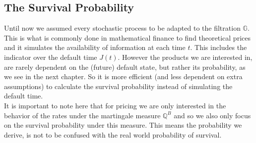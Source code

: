 \documentclass[12pt]{article}
\begin{document}
	
	\subsection{The Survival Probability}
	Until now we assumed every stochastic process to be adapted to the filtration $\mathbb{G}$. This is what is commonly done in mathematical finance to find theoretical prices and it simulates the availability of  information at each time $t$. This includes the indicator over the default time $J(t)$. However the products we are interested in, are rarely dependent on the (future) default state, but rather its probability, as we see in the next chapter. So it is more efficient (and less dependent on extra assumptions) to calculate the survival probability instead of simulating the default time.\\
	
	It is important to note here that for pricing we are only interested in the behavior of the rates under the martingale measure $\mathbb{Q}^B$ and so we also only focus on the survival probability under this measure. This means the probability we derive, is not to be confused with the real world probability of survival.\\
	
\end{document}
